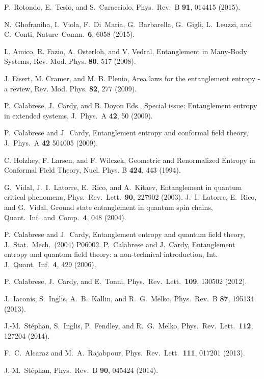\documentclass[twocolumn,superscriptaddress,prb,10pt]{revtex4-1}
\begin{document}
\begin{thebibliography}{99}
P.~Rotondo, E.~Tesio, and S.~Caracciolo, Phys.\ Rev.\ B {\bf 91}, 
014415 (2015). 


N.~Ghofraniha, I.~Viola, F.~Di~Maria, G.~Barbarella, G.~Gigli, L.~Leuzzi, 
and C.~Conti, Nature\ Comm.\ {\bf 6}, 6058 (2015). 

L. Amico, R. Fazio, A. Osterloh, and V. Vedral, Entanglement in Many-Body 
Systems, Rev. Mod. Phys. {\bf 80}, 517 (2008).


J. Eisert, M. Cramer, and M. B. Plenio, Area laws for the entanglement 
entropy - a review, Rev. Mod. Phys. {\bf 82}, 277 (2009).


P.~Calabrese, J.~Cardy, and B. Doyon Eds., Special issue: Entanglement 
entropy in extended systems, J.\ Phys.\ A {\bf 42}, 50 (2009).


P.~Calabrese and J.~Cardy, Entanglement entropy and conformal field theory, 
J.\ Phys.\ A {\bf 42} 504005 (2009).

 C. Holzhey, F. Larsen, and F. Wilczek,
Geometric and Renormalized Entropy in Conformal Field Theory,
Nucl. Phys. B {\bf 424}, 443 (1994).


G.~Vidal, J.~I.~Latorre, E.~Rico, and A.~Kitaev,
Entanglement in quantum critical phenomena, Phys.\ Rev.\ Lett.\ 
{\bf 90}, 227902 (2003). J.~I.~Latorre, E.~Rico, and G.~Vidal,
Ground state entanglement in quantum spin chains, Quant.\ Inf.\ 
and\ Comp.\ {\bf 4}, 048 (2004).


P.~Calabrese and J.~Cardy, Entanglement entropy and quantum field theory,
J.\ Stat.\ Mech.\ (2004) P06002. 
P.~Calabrese and J.~Cardy, Entanglement entropy and quantum field theory: 
a non-technical introduction, Int. J.\ Quant.\ Inf.\ {\bf 4}, 429 (2006).

\bibitem{calabrese-2012}
P.~Calabrese, J.~Cardy, and E.~Tonni, Phys.\ Rev.\ Lett.\ {\bf 109}, 
130502 (2012). 

J.~Iaconis, S.~Inglis, A.~B.~Kallin, and R.~G.~Melko, 
Phys.\ Rev.\ B {\bf 87}, 195134 (2013).

J.-M.~St\'ephan, S.~Inglis, P.~Fendley, and R.~G.~Melko, 
Phys.\ Rev.\ Lett.\ {\bf 112}, 127204 (2014).

F.~C.~Alcaraz and M.~A.~Rajabpour, Phys.\ Rev.\ Lett.\ {\bf 111}, 017201 (2013).

\bibitem{stephan-2014-a}
J.-M.~St\'ephan, Phys.\ Rev.\ B {\bf 90}, 045424 (2014). 


\end{thebibliography}
\end{document}

